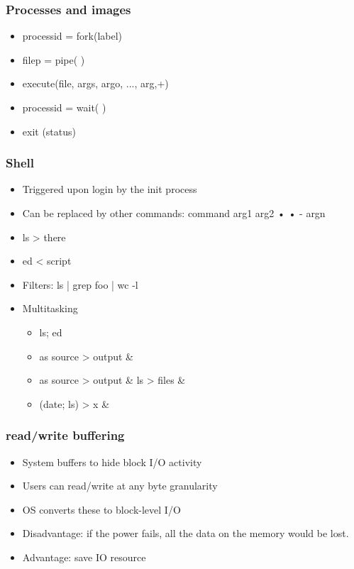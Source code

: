 \documentclass[12pt]{article}
\begin{document}
\subsubsection{Processes and images}
\begin{itemize}
    \item processid = fork(label) 
    \item filep = pipe( ) 
    \item execute(file, args, argo, ..., arg,+) 
    \item processid = wait( ) 
    \item exit (status)
\end{itemize}
\subsubsection{Shell}
\begin{itemize}
    \item Triggered upon login by the init process 
    \item Can be replaced by other commands: command arg1 arg2 • • - argn 
    \item ls > there 
    \item ed < script 
    \item Filters: ls | grep foo | wc -l 
    \item Multitasking \begin{itemize}
        \item ls; ed
        \item as source > output \&
        \item as source > output \& ls > files \&
        \item (date; ls) > x \&
    \end{itemize}
\end{itemize}
\subsubsection{read/write buffering}
\begin{itemize}
    \item System buffers to hide block I/O activity 
    \item Users can read/write at any byte granularity 
    \item OS converts these to block-level I/O
    \item Disadvantage: if the power fails, all the data on the memory would be lost.
    \item Advantage: save IO resource
\end{itemize}
\end{document}
